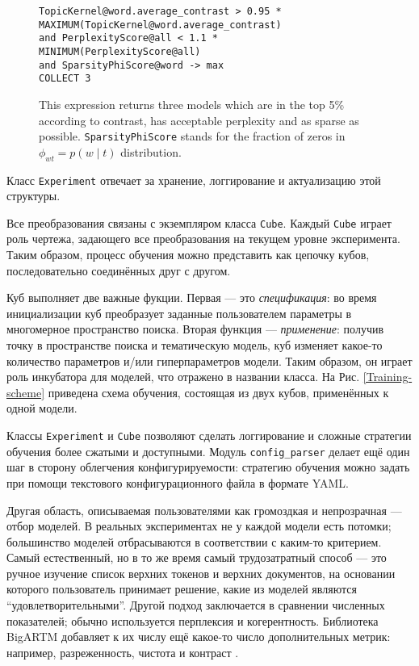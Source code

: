\begin{figure*}[!ht]
\footnotesize
\texttt{TopicKernel@word.average\_contrast > 0.95 * MAXIMUM(TopicKernel@word.average\_contrast) \\
\hphantom{\ \ } and PerplexityScore@all < 1.1 * MINIMUM(PerplexityScore@all) \\
\hphantom{\ \ } and SparsityPhiScore@word -> max\\
\hphantom{\ \ } COLLECT 3}
\caption{This expression returns three models which are in the top 5\% according to contrast, has acceptable perplexity and as sparse as possible. \texttt{SparsityPhiScore} stands for the fraction of zeros in $\phi_{wt} = p(w \mid t)$ distribution.}
\label{DSL-example}
\end{figure*}


Класс \texttt{Experiment} отвечает за хранение, логгирование и актуализацию этой структуры. 

Все преобразования связаны с экземпляром класса \texttt{Cube}. Каждый \texttt{Cube} играет роль чертежа, задающего все преобразования на текущем уровне эксперимента. Таким образом, процесс обучения можно представить как цепочку кубов, последовательно соединённых друг с другом.

Куб выполняет две важные фукции. Первая --- это \textit{спецификация}: во время инициализации куб преобразует заданные пользователем параметры в многомерное пространство поиска. Вторая функция --- \textit{применение}: получив точку в пространстве поиска и тематическую модель, куб изменяет какое-то количество параметров и/или гиперпараметров модели. Таким образом, он играет роль инкубатора для моделей, что отражено в названии класса. На Рис.  \ref{Training-scheme} приведена схема обучения, состоящая из двух кубов, применённых к одной модели.

Классы \texttt{Experiment} и \texttt{Cube} позволяют сделать логгирование и сложные стратегии обучения более сжатыми и доступными. Модуль \texttt{config\_parser} делает ещё один шаг в сторону облегчения конфигурируемости: стратегию обучения можно задать при помощи текстового конфигурационного файла в формате YAML.

Другая область, описываемая пользователями как громоздкая и непрозрачная --- отбор моделей. В реальных экспериментах не у каждой модели есть потомки; большинство моделей отбрасываются в соответствии с каким-то критерием. Самый естественный, но в то же время самый трудозатратный способ --- это ручное изучение список верхних токенов и верхних документов, на основании которого пользователь принимает решение, какие из моделей являются ``удовлетворительными''. Другой подход заключается в сравнении численных показателей; обычно используется перплексия и когерентность. Библиотека \mbox{BigARTM} добавляет к их числу ещё какое-то число дополнительных метрик: например, разреженность, чистота и контраст \cite{voron15mlj}.

